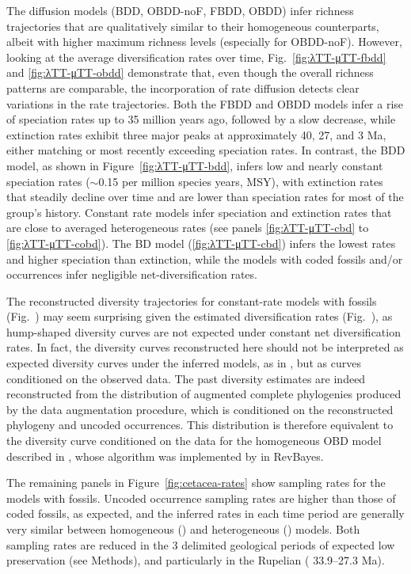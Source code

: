 \documentclass[oupdraft]{sysbio}
\newcommand{\revised}[1]{{\color{blue} #1}}
\begin{document}
The diffusion models (BDD, OBDD-noF, FBDD, OBDD) infer richness trajectories that are qualitatively similar to their homogeneous counterparts, albeit with higher maximum richness levels (especially for OBDD-noF). However, looking at the average diversification rates over time, Fig.~\ref{fig:λTT-μTT-fbdd} and \ref{fig:λTT-μTT-obdd} demonstrate that, even though the overall richness patterns are comparable, the incorporation of rate diffusion detects clear variations in the rate trajectories. Both the FBDD and OBDD models infer a rise of speciation rates up to 35 million years ago, followed by a slow decrease, while extinction rates exhibit three major peaks at approximately 40, 27, and 3 Ma, either matching or most recently exceeding speciation rates. In contrast, the BDD model, as shown in Figure~\ref{fig:λTT-μTT-bdd}, infers low and nearly constant speciation rates ($\sim$0.15 per million species years, MSY), with extinction rates that steadily decline over time and are lower than speciation rates for most of the group's history. Constant rate models infer speciation and extinction rates that are close to averaged heterogeneous rates (see panels \ref{fig:λTT-μTT-cbd} to \ref{fig:λTT-μTT-cobd}). The BD model (\ref{fig:λTT-μTT-cbd}) infers the lowest rates and higher speciation than extinction, while the models with \revised{coded} fossils and/or occurrences infer negligible net-diversification rates.

The reconstructed diversity trajectories for constant-rate models with fossils (Fig.~) may seem surprising given the estimated diversification rates (Fig.~), as hump-shaped diversity curves are not expected under constant net diversification rates. In fact, the diversity curves reconstructed here should not be interpreted as expected diversity curves under the inferred models, as in \citet{etienne_diversity-dependence_2011, billaud_estimating_2019}, but as curves conditioned on the observed data. The past diversity estimates are indeed reconstructed from the distribution of augmented complete phylogenies produced by the data augmentation procedure, which is conditioned on the reconstructed phylogeny and \revised{uncoded} occurrences. This distribution is therefore equivalent to the diversity curve conditioned on the data for the homogeneous OBD model described in \citet{manceau_probability_2021}, whose algorithm was implemented by \citet{andreoletti_occurrence_2022} in RevBayes.

The remaining panels in Figure~\ref{fig:cetacea-rates} show sampling rates for the models with fossils. \revised{Uncoded} occurrence sampling rates are higher than those of \revised{coded} fossils, as expected, and the inferred rates in each time period are generally very similar between homogeneous () and heterogeneous () models. Both sampling rates are reduced in the 3 delimited geological periods of expected low preservation (see Methods), and particularly in the Rupelian (\revised{33.9--27.3} Ma).
\end{document}
